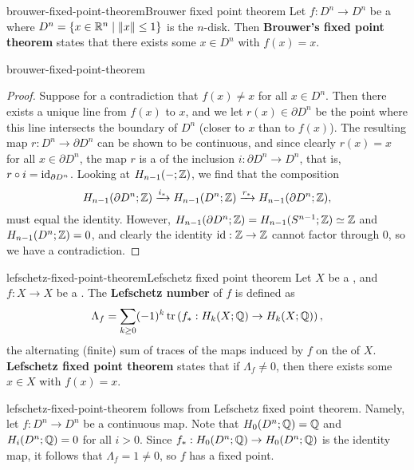 \begin{topic}{brouwer-fixed-point-theorem}{Brouwer fixed point theorem}
    Let $f : D^n \to D^n$ be a  where $D^n = \{ x \in \mathbb{R}^n \mid \left\|x\right\| \le 1 \}$ is the $n$-disk. Then \textbf{Brouwer's fixed point theorem} states that there exists some $x \in D^n$ with $f(x) = x$.
\end{topic}

\begin{example}{brouwer-fixed-point-theorem}
    \begin{proof}
        Suppose for a contradiction that $f(x) \ne x$ for all $x \in D^n$. Then there exists a unique line from $f(x)$ to $x$, and we let $r(x) \in \partial D^n$ be the point where this line intersects the boundary of $D^n$ (closer to $x$ than to $f(x)$). The resulting map $r : D^n \to \partial D^n$ can be shown to be continuous, and since clearly $r(x) = x$ for all $x \in \partial D^n$, the map $r$ is a  of the inclusion $i : \partial D^n \to D^n$, that is, $r \circ i = \text{id}_{\partial D^n}$. Looking at  $H_{n - 1}(-; \mathbb{Z})$, we find that the composition
        \[ H_{n - 1}(\partial D^n; \mathbb{Z}) \xrightarrow{i_*} H_{n - 1}(D^n; \mathbb{Z}) \xrightarrow{r_*} H_{n - 1}(\partial D^n; \mathbb{Z}) , \]
        must equal the identity. However, $H_{n - 1}(\partial D^n; \mathbb{Z}) = H_{n - 1}(S^{n - 1}; \mathbb{Z}) \simeq \mathbb{Z}$ and $H_{n - 1}(D^n; \mathbb{Z}) = 0$, and clearly the identity $\text{id} : \mathbb{Z} \to \mathbb{Z}$ cannot factor through $0$, so we have a contradiction.
    \end{proof}
\end{example}

\begin{topic}{lefschetz-fixed-point-theorem}{Lefschetz fixed point theorem}
    Let $X$ be a , and $f : X \to X$ be a . The \textbf{Lefschetz number} of $f$ is defined as
    \[ \Lambda_f = \sum_{k \ge 0} (-1)^k \operatorname{tr} \left(f_* : H_k(X; \mathbb{Q}) \to H_k(X; \mathbb{Q}) \right) , \]
    the alternating (finite) sum of traces of the maps induced by $f$ on the  of $X$. \textbf{Lefschetz fixed point theorem} states that if $\Lambda_f \ne 0$, then there exists some $x \in X$ with $f(x) = x$.
\end{topic}

\begin{example}{lefschetz-fixed-point-theorem}
     follows from Lefschetz fixed point theorem. Namely, let $f : D^n \to D^n$ be a continuous map. Note that $H_0(D^n; \mathbb{Q}) = \mathbb{Q}$ and $H_i(D^n; \mathbb{Q}) = 0$ for all $i > 0$. Since $f_* : H_0(D^n; \mathbb{Q}) \to H_0(D^n; \mathbb{Q})$ is the identity map, it follows that $\Lambda_f = 1 \ne 0$, so $f$ has a fixed point.
\end{example}

